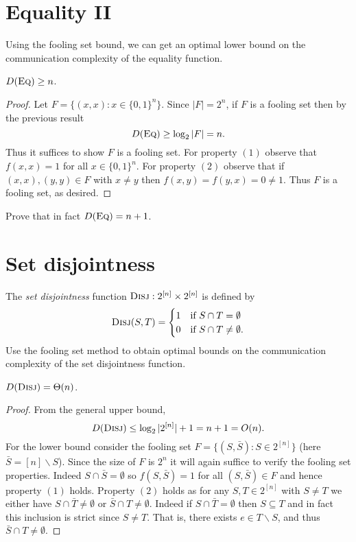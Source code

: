 \newpage \section{Equality II}

Using the fooling set bound, we can get an optimal lower bound on the communication complexity of the equality function.

\begin{theorem}
$D(\textsc{Eq}) \ge n$.
\end{theorem}

\begin{proof}
Let $F = \{(x,x) : x \in \{0,1\}^n\}$. Since $|F| = 2^n$, if $F$ is a fooling set then by the previous result 
$$D(\textsc{Eq}) \ge \log_2|F| = n.$$
Thus it suffices to show $F$ is a fooling set. For property $(1)$ observe that $f(x,x) = 1$ for all $x\in\{0,1\}^n$. For property $(2)$ observe that if $(x,x), (y,y) \in F$ with $x\neq y$ then $f(x,y) = f(y,x) = 0\neq 1$. Thus $F$ is a fooling set, as desired.
\end{proof}

\exercises

\begin{exercise}
Prove that in fact $D(\textsc{Eq}) = n+1$.
\end{exercise}


\newpage \section{Set disjointness}

The \emph{set disjointness} function $\textsc{Disj} : 2^{[n]} \times 2^{[n]}$ is defined by
\[
\textsc{Disj}(S,T) = \begin{cases}
1 & \mbox{if } S \cap T = \emptyset \\
0 & \mbox{if } S \cap T \neq \emptyset.
\end{cases}
\]
Use the fooling set method to obtain optimal bounds on the communication complexity of the set disjointness function.

\begin{theorem}
$D(\textsc{Disj}) = \Theta(n)$.
\end{theorem}

\begin{proof}
From the general upper bound,
$$D(\textsc{Disj}) \leq \log_2|2^{[n]}| + 1 = n +1 = O(n).$$
For the lower bound consider the fooling set $F = \{(S,\bar{S}) : S \in 2^{[n]}\}$ (here $\bar{S} = [n]\backslash S$). Since the size of $F$ is $2^n$ it will again suffice to verify the fooling set properties. Indeed $S\cap \bar{S}= \emptyset$ so $f(S,\bar{S}) = 1$ for all $(S,\bar{S}) \in F$ and hence property $(1)$ holds. Property $(2)$ holds as for any $S,T \in 2^{[n]}$ with $S\neq T$ we either have $S\cap \bar{T} \neq \emptyset$ or $\bar{S}\cap T \neq \emptyset$.
Indeed if $S\cap \bar{T}= \emptyset$ then $S\subseteq T$ and in fact this inclusion is strict since $S\neq T$. That is, there exists $e \in T\backslash S$, and thus $\bar{S}\cap T \neq \emptyset$.
\end{proof}



